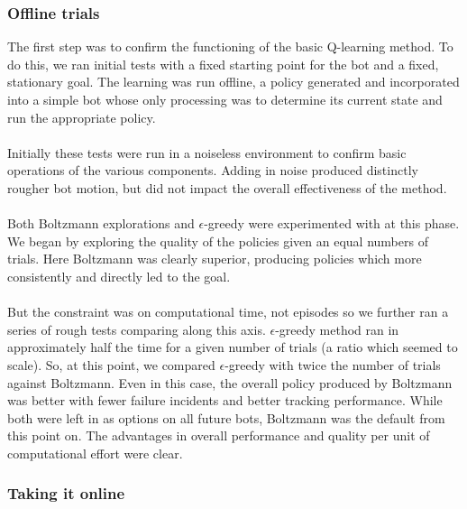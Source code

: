 \documentclass{aiaa-tc}%
\begin{document}
\subsubsection{Offline trials}
The first step was to confirm the functioning of the basic
Q-learning method. To do this, we ran initial tests with a fixed
starting point for the bot and a fixed, stationary
goal. The learning was run offline, a policy generated and
incorporated into a simple bot whose only processing was to determine
its current state and run the appropriate policy. \\ \\
Initially these tests were run in a noiseless environment to
confirm basic operations of the various components. Adding in noise
produced distinctly rougher bot motion, but did not impact the overall
effectiveness of the method. \\ \\
Both Boltzmann explorations and $\epsilon$-greedy were experimented
with at this phase.  We began by exploring the quality of the policies
given an equal numbers of trials. Here Boltzmann was clearly
superior, producing policies which more consistently and directly led
to the goal. \\ \\
But the constraint was on computational time, not episodes so we
further ran a series of rough tests comparing along this axis. $\epsilon$-greedy method ran in approximately half the
time for a given number of trials (a ratio which seemed to scale). So, at this point, we compared $\epsilon$-greedy
with twice the number of trials against Boltzmann. Even in this case,
the overall policy produced by Boltzmann was better with fewer failure
incidents and better tracking performance. While both were left in as options on all future
bots, Boltzmann was the default from this point on. The advantages in
overall performance and quality per unit of computational effort were
clear.
\subsubsection{Taking it online}
\end{document}
